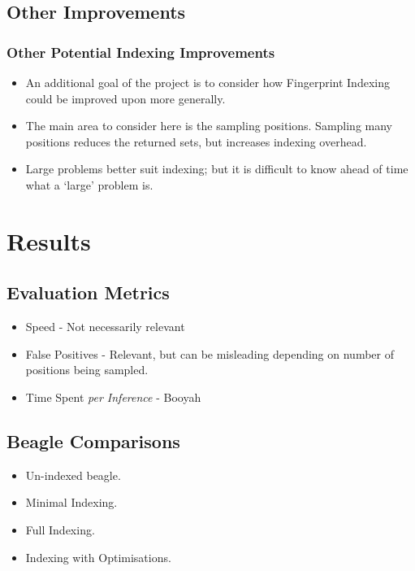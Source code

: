 \documentclass[10pt]{beamer}
\begin{document}
\begin{NoHyper}
\subsection{Other Improvements}
\begin{frame}
  \frametitle{Other Potential Indexing Improvements}
  \begin{itemize}
  \item<1-> An additional goal of the project is to consider how Fingerprint Indexing
  could be improved upon more generally.
  \item<2-> The main area to consider here is the sampling positions. Sampling many
  positions reduces the returned sets, but increases indexing overhead.
  \item<3-> Large problems better suit indexing; but it is difficult to know ahead of
  time what a `large' problem is.
  \end{itemize}
\end{frame}



\section{Results}

\subsection{Evaluation Metrics}
\begin{frame}
  \begin{itemize}
  \frametitle{Metrics for Analysing Indexing Performance}
  \item<1-> Speed - Not necessarily relevant
  \item<2-> False Positives - Relevant, but can be misleading depending on
  number of positions being sampled.
  \item<3-> Time Spent \emph{per Inference} - Booyah
  \end{itemize}
\end{frame}


\subsection{Beagle Comparisons}
\begin{frame}
  \begin{itemize}
  \frametitle{Comparing Varieties of Beagle}
  \item<1-> Un-indexed beagle.
  \item<2-> Minimal Indexing.
  \item<3-> Full Indexing.
  \item<4-> Indexing with Optimisations.
  \end{itemize}
\end{frame}


\end{NoHyper}
\end{document}
